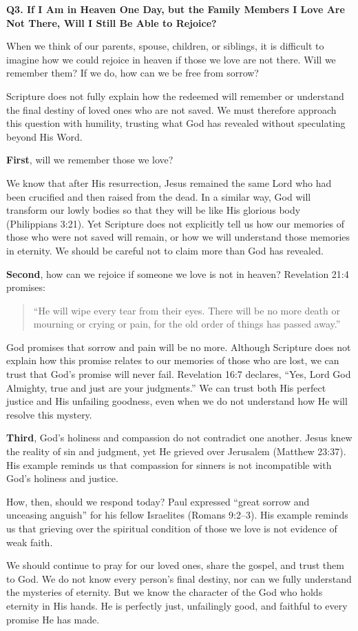 \vspace{0.3cm}


\noindent \textbf{Q3. If I Am in Heaven One Day, but the Family Members I Love Are Not There, Will I Still Be Able to Rejoice?}

When we think of our parents, spouse, children, or siblings, it is difficult to imagine how we could rejoice in heaven if those we love are not there. Will we remember them? If we do, how can we be free from sorrow?

Scripture does not fully explain how the redeemed will remember or understand the final destiny of loved ones who are not saved. We must therefore approach this question with humility, trusting what God has revealed without speculating beyond His Word.

\textbf{First}, will we remember those we love?

We know that after His resurrection, Jesus remained the same Lord who had been crucified and then raised from the dead. In a similar way, God will transform our lowly bodies so that they will be like His glorious body (Philippians 3:21). Yet Scripture does not explicitly tell us how our memories of those who were not saved will remain, or how we will understand those memories in eternity. We should be careful not to claim more than God has revealed.

\textbf{Second}, how can we rejoice if someone we love is not in heaven?
Revelation 21:4 promises:

\begin{quote}
``He will wipe every tear from their eyes. There will be no more death or mourning or crying or pain, for the old order of things has passed away.''
\end{quote}

God promises that sorrow and pain will be no more. Although Scripture does not explain how this promise relates to our memories of those who are lost, we can trust that God's promise will never fail. Revelation 16:7 declares, ``Yes, Lord God Almighty, true and just are your judgments.'' We can trust both His perfect justice and His unfailing goodness, even when we do not understand how He will resolve this mystery.

\textbf{Third}, God's holiness and compassion do not contradict one another.
Jesus knew the reality of sin and judgment, yet He grieved over Jerusalem (Matthew 23:37). His example reminds us that compassion for sinners is not incompatible with God's holiness and justice.

How, then, should we respond today? Paul expressed ``great sorrow and unceasing anguish'' for his fellow Israelites (Romans 9:2–3). His example reminds us that grieving over the spiritual condition of those we love is not evidence of weak faith.

We should continue to pray for our loved ones, share the gospel, and trust them to God. We do not know every person's final destiny, nor can we fully understand the mysteries of eternity. But we know the character of the God who holds eternity in His hands. He is perfectly just, unfailingly good, and faithful to every promise He has made.
